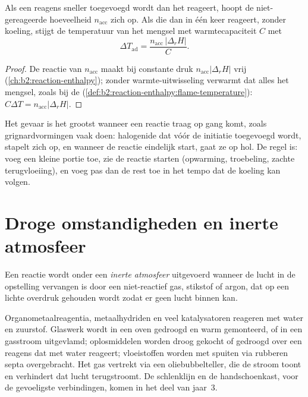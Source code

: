 \begin{proposition}[Accumulatie]\label{prop:b2:lab-techniques-2:accumulation}
Als een reagens sneller toegevoegd wordt dan het reageert, hoopt de niet-gereageerde hoeveelheid $n_{\mathrm{acc}}$ zich op. Als
die dan in één keer reageert, zonder koeling, stijgt de temperatuur van het mengsel met warmtecapaciteit $C$ met
\begin{equation*}
\Delta T_{\mathrm{ad}} = \frac{n_{\mathrm{acc}}\,|\Delta_rH|}{C}.
\end{equation*}
\end{proposition}

\begin{proof}
De reactie van $n_{\mathrm{acc}}$ maakt bij constante druk $n_{\mathrm{acc}}|\Delta_rH|$ vrij
(\cref{ch:b2:reaction-enthalpy}); zonder warmte-uitwisseling verwarmt dat alles het mengsel, zoals bij de
 (\cref{def:b2:reaction-enthalpy:flame-temperature}): $C\Delta T =
n_{\mathrm{acc}}|\Delta_rH|$.
\end{proof}

Het gevaar is het grootst wanneer een reactie traag op gang komt, zoals grignardvormingen vaak doen: halogenide dat
vóór de initiatie toegevoegd wordt, stapelt zich op, en wanneer de reactie eindelijk start, gaat ze op hol. De regel is: voeg een kleine
portie toe, zie de reactie starten (opwarming, troebeling, zachte terugvloeiing), en voeg pas dan de rest toe in het
tempo dat de koeling kan volgen.

\section{Droge omstandigheden en inerte atmosfeer}

\begin{definition}\label{def:b2:lab-techniques-2:inert}
Een reactie wordt onder een \emph{inerte atmosfeer} uitgevoerd wanneer de lucht in de opstelling
vervangen is door een niet-reactief gas, stikstof of argon, dat op een lichte overdruk gehouden wordt zodat er geen lucht
binnen kan.
\end{definition}

Organometaalreagentia, metaalhydriden en veel katalysatoren reageren met water en zuurstof. Glaswerk wordt
in een oven gedroogd en warm gemonteerd, of in een gasstroom uitgevlamd; oplosmiddelen worden droog gekocht of gedroogd
over een reagens dat met water reageert; vloeistoffen worden met spuiten via rubberen septa overgebracht.
Het gas vertrekt via een oliebubbelteller, die de stroom toont en verhindert dat lucht terugstroomt. De
schlenklijn en de handschoenkast, voor de gevoeligste verbindingen, komen in het deel van jaar~3.

